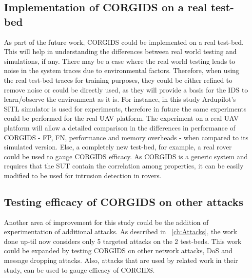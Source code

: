 \subsection{Implementation of \ac{CORGIDS} on a real test-bed}
As part of the future work, \ac{CORGIDS} could be implemented on a real test-bed. This will help in understanding the differences between real world testing and simulations, if any. There may be a case where the real world testing leads to noise in the system traces due to environmental factors. Therefore, when using the real test-bed traces for training purposes, they could be either refined to remove noise or could be directly used, as they will provide a basis for the IDS to learn/observe the environment as it is. For instance, in this study Ardupilot's \ac{SITL} simulator is used for experiments, therefore in future the same experiments could be performed for the real \ac{UAV} platform. The experiment on a real \ac{UAV} platform will allow a detailed comparison in the differences in performance of \ac{CORGIDS} - \ac{FP}, \ac{FN}, performance and memory overheads - when compared to its simulated version. Else, a completely new test-bed, for example, a real rover could be used to gauge \ac{CORGIDS} efficacy. As \ac{CORGIDS} is a generic system and requires that the \ac{SUT} contain the correlation among properties, it can be easily modified to be used for intrusion detection in rovers.

\subsection{Testing efficacy of \ac{CORGIDS} on other attacks}
Another area of improvement for this study could be the addition of experimentation of additional attacks. As described in ~\autoref{ch:Attacks}, the work done up-til now considers only 5 targeted attacks on the 2 test-beds. This work could be expanded by testing \ac{CORGIDS} on other network attacks, \ac{DoS} and message dropping attacks. Also, attacks that are used by related work in their study, can be used to gauge efficacy of \ac{CORGIDS}.

